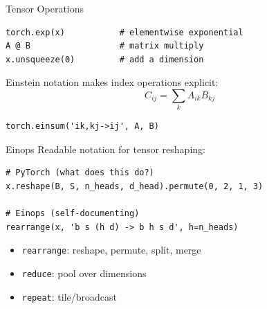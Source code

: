 \documentclass[aspectratio=169]{beamer}
\begin{document}
\begin{frame}[fragile]{Tensor Operations}
\begin{verbatim}
torch.exp(x)           # elementwise exponential
A @ B                  # matrix multiply
x.unsqueeze(0)         # add a dimension
\end{verbatim}
\vspace{1em}

Einstein notation makes index operations explicit:
$$C_{ij} = \sum_k A_{ik} B_{kj}$$
\begin{verbatim}
torch.einsum('ik,kj->ij', A, B)
\end{verbatim}
\end{frame}

\begin{frame}[fragile]{Einops}
Readable notation for tensor reshaping:
\begin{verbatim}
# PyTorch (what does this do?)
x.reshape(B, S, n_heads, d_head).permute(0, 2, 1, 3)

# Einops (self-documenting)
rearrange(x, 'b s (h d) -> b h s d', h=n_heads)
\end{verbatim}
\vspace{0.5em}
\begin{itemize}
\item \texttt{rearrange}: reshape, permute, split, merge
\item \texttt{reduce}: pool over dimensions
\item \texttt{repeat}: tile/broadcast
\end{itemize}
\end{frame}
\end{document}
